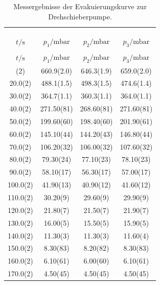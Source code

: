    \begin{longtable}{S[table-format=3.1(1)] S[table-format=3.3(3)] S[table-format=3.3(3)] S[table-format=3.3(3)]}
        \centering\\
        \label{tab:drehEvac}\\
        \caption{Messergebnisse der Evakuierungskurve zur Drehschieberpumpe.}\\
        \toprule
        {$t/\si{\second}$} & {$p_1/\si{\milli\bar}$} & {$p_2/\si{\milli\bar}$} & {$p_3/\si{\milli\bar}$} \\
        \midrule
        \endfirsthead
        \caption{Messergebnisse der Evakuierungskurve zur Drehschieberpumpe.}\\
        \toprule
        {$t/\si{\second}$} & {$p_1/\si{\milli\bar}$} & {$p_2/\si{\milli\bar}$} & {$p_3/\si{\milli\bar}$} \\
        \midrule
        \endhead
        \bottomrule
        \endfoot
        \bottomrule
        (2) & 660.9(2.0) & 646.3(1.9) & 659.0(2.0)\\ 
        20.0(2) & 488.1(1.5) & 498.3(1.5) & 474.6(1.4)\\ 
        30.0(2) & 364.7(1.1) & 360.3(1.1) & 364.0(1.1)\\ 
        40.0(2) & 271.50(81) & 268.60(81) & 271.60(81)\\ 
        50.0(2) & 199.60(60) & 198.40(60) & 201.90(61)\\ 
        60.0(2) & 145.10(44) & 144.20(43) & 146.80(44)\\ 
        70.0(2) & 106.20(32) & 106.00(32) & 107.60(32)\\ 
        80.0(2) & 79.30(24) & 77.10(23) & 78.10(23)\\ 
        90.0(2) & 58.10(17) & 56.30(17) & 57.00(17)\\ 
        100.0(2) & 41.90(13) & 40.90(12) & 41.60(12)\\ 
        110.0(2) & 30.20(9) & 29.60(9) & 29.90(9)\\ 
        120.0(2) & 21.80(7) & 21.50(7) & 21.90(7)\\ 
        130.0(2) & 16.00(5) & 15.50(5) & 15.90(5)\\ 
        140.0(2) & 11.30(3) & 11.30(3) & 11.60(4)\\ 
        150.0(2) & 8.30(83) & 8.20(82) & 8.30(83)\\ 
        160.0(2) & 6.10(61) & 6.00(60) & 6.10(61)\\ 
        170.0(2) & 4.50(45) & 4.50(45) & 4.50(45)\\ 

\end{longtable}

